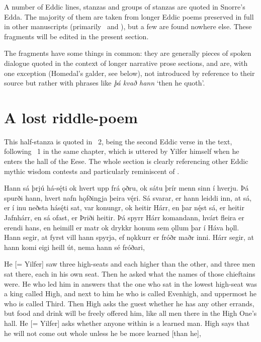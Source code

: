 
A number of Eddic lines, stanzas and groups of stanzas are quoted in Snorre’s Edda.  The majority of them are taken from longer Eddic poems preserved in full in other manuscripts (primarily \Regius\ and \AM), but a few are found nowhere else.  These fragments will be edited in the present section.

The fragments have some things in common: they are generally pieces of spoken dialogue quoted in the context of longer narrative prose sections, and are, with one exception (Homedal’s galder, see below), not introduced by reference to their source but rather with phrases like \emph{þá kvað hann} ‘then he quoth’.

\sectionline

\section{A lost riddle-poem}

This half-stanza is quoted in \Gylfaginning\ 2, being the second Eddic verse in the text, following \Havamal\ 1 in the same chapter, which is uttered by Yilfer himself when he enters the hall of the Eese. The whole section is clearly referencing other Eddic mythic wisdom contests and particularly reminiscent of \Vafthrudnismal.

\bpg\bpa Hann sá þrjú há-sę́ti ok hvert upp frá ǫðru, ok sátu þrír menn sinn í hverju. Þá spurði hann, hvert nafn hǫfðingja þeira vę́ri. Sá svarar, er hann leiddi inn, at sá, er í inu neðsta hásę́ti sat, var konungr, ok heitir Hárr, en þar nę́st sá, er heitir Jafnhárr, en sá ofast, er Þriði heitir. Þá spyrr Hárr komandann, hvárt fleira er erendi hans, en heimill er matr ok drykkr honum sem ǫllum þar í Háva hǫll. Hann segir, at fyrst vill hann spyrja, ef nǫkkurr er fróðr maðr inni. Hárr segir, at hann komi eigi heill út, nema hann sé fróðari,\epa

\bpb He [= Yilfer] saw three high-seats and each higher than the other, and three men sat there, each in his own seat. Then he asked what the names of those chieftains were. He who led him in answers that the one who sat in the lowest high-seat was a king called High, and next to him he who is called Evenhigh, and uppermost he who is called Third. Then High asks the guest whether he has any other errands, but food and drink will be freely offered him, like all men there in the High One’s hall. He [= Yilfer] asks whether anyone within is a learned man.  High says that he will not come out whole unless he be more learned [than he],\epb\epg

